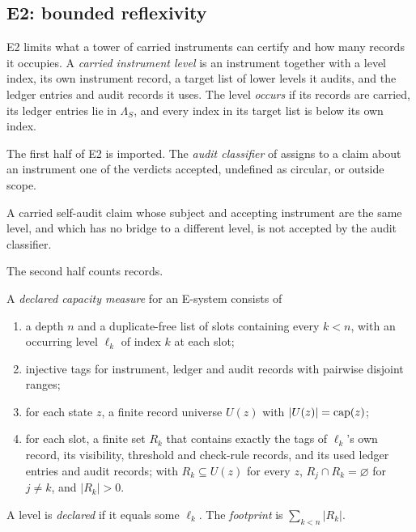 \subsection{E2: bounded reflexivity}\label{sec:capacity}

E2 limits what a tower of carried instruments can certify and how many records it occupies. A
\emph{carried instrument level} is an instrument together with a level index, its own instrument
record, a target list of lower levels it audits, and the ledger entries and audit records it uses.
The level \emph{occurs} if its records are carried, its ledger entries lie in $\Lambda_S$, and every
index in its target list is below its own index.

The first half of E2 is imported. The \emph{audit classifier} of \FoundIII{} assigns to a claim
about an instrument one of the verdicts accepted, undefined as circular, or outside scope.

\begin{proposition}\label{prop:e2-self}
A carried self-audit claim whose subject and accepting instrument are the same level, and which has
no bridge to a different level, is not accepted by the audit classifier.
\end{proposition}

The second half counts records.

\begin{definition}\label{def:declared-measure}
A \emph{declared capacity measure} for an E-system consists of
\begin{enumerate}
  \item a depth $n$ and a duplicate-free list of slots containing every $k < n$, with an occurring
    level $\ell_k$ of index $k$ at each slot;
  \item injective tags for instrument, ledger and audit records with pairwise disjoint ranges;
  \item for each state $z$, a finite record universe $U(z)$ with $|U(z)| = \operatorname{cap}(z)$;
  \item for each slot, a finite set $R_k$ that contains exactly the tags of $\ell_k$'s own
    record, its visibility, threshold and check-rule records, and its used ledger entries and audit
    records; with $R_k \subseteq U(z)$ for every $z$, $R_j \cap R_k = \varnothing$ for $j \ne k$, and
    $|R_k| > 0$.
\end{enumerate}
A level is \emph{declared} if it equals some $\ell_k$. The \emph{footprint} is
$\sum_{k<n} |R_k|$.
\end{definition}

